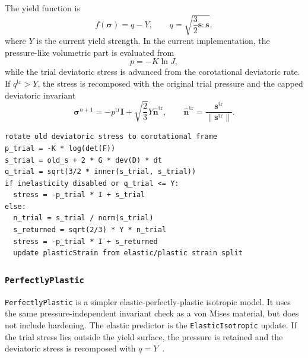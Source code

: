 The yield function is
\begin{equation}
  f(\boldsymbol{\sigma})=q-Y,
  \qquad
  q=\sqrt{\frac{3}{2}\mathbf{s}:\mathbf{s}},
  \label{eq:von-mises-yield}
\end{equation}
where \(Y\) is the current yield strength.  In the current implementation, the pressure-like volumetric part is evaluated from
\begin{equation}
  p = -K\ln J,
  \label{eq:von-mises-volumetric-pressure}
\end{equation}
while the trial deviatoric stress is advanced from the corotational deviatoric rate.  If \(q^{\mathrm{tr}}>Y\), the stress is recomposed with the original trial pressure and the capped deviatoric invariant
\begin{equation}
  \boldsymbol{\sigma}^{n+1}= -p^{\mathrm{tr}}\mathbf{I}
  + \sqrt{\frac{2}{3}}Y\widehat{\mathbf{n}}^{\mathrm{tr}},
  \qquad
  \widehat{\mathbf{n}}^{\mathrm{tr}}=\frac{\mathbf{s}^{\mathrm{tr}}}{\|\mathbf{s}^{\mathrm{tr}}\|}.
\end{equation}

\begin{lstlisting}[caption={VonMisesJ radial-return structure.},label={alg:von-mises-update},basicstyle=\ttfamily\small]
rotate old deviatoric stress to corotational frame
p_trial = -K * log(det(F))
s_trial = old_s + 2 * G * dev(D) * dt
q_trial = sqrt(3/2 * inner(s_trial, s_trial))
if inelasticity disabled or q_trial <= Y:
  stress = -p_trial * I + s_trial
else:
  n_trial = s_trial / norm(s_trial)
  s_returned = sqrt(2/3) * Y * n_trial
  stress = -p_trial * I + s_returned
  update plasticStrain from elastic/plastic strain split
\end{lstlisting}

\subsubsection{\texttt{PerfectlyPlastic}}
\label{subsubsec:perfectly-plastic-model}

\texttt{PerfectlyPlastic} is a simpler elastic-perfectly-plastic isotropic model.  It uses the same pressure-independent invariant check as a von Mises material, but does not include hardening.  The elastic predictor is the \texttt{ElasticIsotropic} update.  If the trial stress lies outside the yield surface, the pressure is retained and the deviatoric stress is recomposed with \(q=Y\)~\cite{simo1998inelasticity}.

